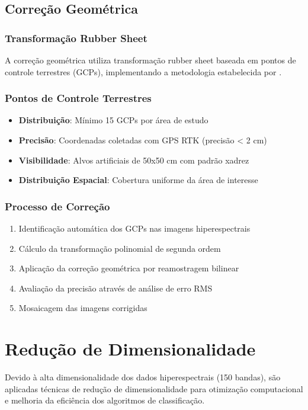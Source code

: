 \subsection{Correção Geométrica}
\subsubsection{Transformação Rubber Sheet}
A correção geométrica utiliza transformação rubber sheet baseada em pontos de controle terrestres (GCPs), implementando a metodologia estabelecida por \cite{Shin2024}.

\subsubsection{Pontos de Controle Terrestres}
\begin{itemize}
    \item \textbf{Distribuição}: Mínimo 15 GCPs por área de estudo
    \item \textbf{Precisão}: Coordenadas coletadas com GPS RTK (precisão < 2 cm)
    \item \textbf{Visibilidade}: Alvos artificiais de 50x50 cm com padrão xadrez
    \item \textbf{Distribuição Espacial}: Cobertura uniforme da área de interesse
\end{itemize}

\subsubsection{Processo de Correção}
\begin{enumerate}
    \item Identificação automática dos GCPs nas imagens hiperespectrais
    \item Cálculo da transformação polinomial de segunda ordem
    \item Aplicação da correção geométrica por reamostragem bilinear
    \item Avaliação da precisão através de análise de erro RMS
    \item Mosaicagem das imagens corrigidas
\end{enumerate}

\section{Redução de Dimensionalidade}\label{sec:reducao_dimensionalidade}

Devido à alta dimensionalidade dos dados hiperespectrais (150 bandas), são aplicadas técnicas de redução de dimensionalidade para otimização computacional e melhoria da eficiência dos algoritmos de classificação.

